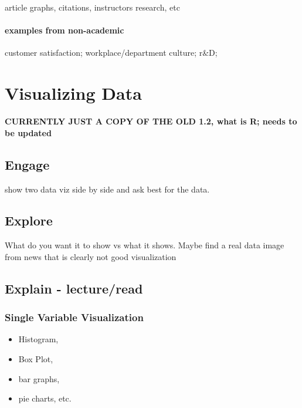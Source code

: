\documentclass[
]{book}
\providecommand{\tightlist}{%
  \setlength{\itemsep}{0pt}\setlength{\parskip}{0pt}}
\begin{document}
article graphs, citations, instructors research, etc

\hypertarget{examples-from-non-academic}{%
\subsubsection{examples from non-academic}\label{examples-from-non-academic}}

customer satisfaction; workplace/department culture; r\&D;

\hypertarget{visualizing-data}{%
\chapter{Visualizing Data}\label{visualizing-data}}

\textbf{CURRENTLY JUST A COPY OF THE OLD 1.2, what is R; needs to be updated }

\hypertarget{engage-1}{%
\section{Engage}\label{engage-1}}

show two data viz side by side and ask best for the data.

\hypertarget{explore-1}{%
\section{Explore}\label{explore-1}}

What do you want it to show vs what it shows. Maybe find a real data image from news that is clearly not good visualization

\hypertarget{explain---lectureread}{%
\section{Explain - lecture/read}\label{explain---lectureread}}

\hypertarget{single-variable-visualization}{%
\subsection{Single Variable Visualization}\label{single-variable-visualization}}

\begin{itemize}
\tightlist
\item
  Histogram,
\item
  Box Plot,
\item
  bar graphs,
\item
  pie charts, etc.
\end{itemize}
\end{document}
